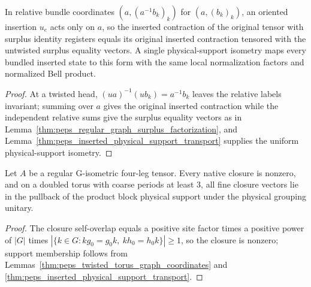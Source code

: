 \begin{lemma}%
    \label{thm:peps_inserted_regular_surplus}
    \leanok
    In relative bundle coordinates $(a,(a^{-1}b_k)_k)$ for $(a,(b_k)_k)$, an
    oriented insertion $u_e$ acts only on $a$, so the inserted contraction of
    the original tensor with surplus identity registers equals its original
    inserted contraction tensored with the untwisted surplus equality vectors.
    A single physical-support isometry maps every bundled inserted state to
    this form with the same local normalization factors and normalized Bell
    product.
\end{lemma}
\begin{proof}\leanok
    At a twisted head, $(ua)^{-1}(ub_k)=a^{-1}b_k$ leaves the relative labels
    invariant; summing over $a$ gives the original inserted contraction while
    the independent relative sums give the surplus equality vectors as in
    Lemma~\ref{thm:peps_regular_graph_surplus_factorization}, and
    Lemma~\ref{thm:peps_inserted_physical_support_transport} supplies the
    uniform physical-support isometry.
\end{proof}

\begin{lemma}%
    \label{thm:peps_twisted_two_by_two_support}
    \leanok
    Let $A$ be a regular G-isometric four-leg tensor. Every native closure is
    nonzero, and on a doubled torus with coarse periods at least $3$, all fine
    closure vectors lie in the pullback of the product block physical support
    under the physical grouping unitary.
\end{lemma}
\begin{proof}\leanok
    The closure self-overlap equals a positive site factor times a positive
    power of $|G|$ times $|\{k\in G:kg_0=g_0k,\ kh_0=h_0k\}|\ge1$, so the
    closure is nonzero; support membership follows from
    Lemmas~\ref{thm:peps_twisted_torus_graph_coordinates} and
    \ref{thm:peps_inserted_physical_support_transport}.
\end{proof}

